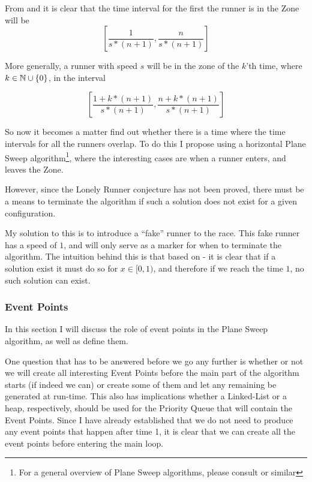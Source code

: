 From  and  it is clear that the time interval for the first the runner is in the Zone will be 
\begin{displaymath}
\left[\frac{1}{s * (n+1)}, \frac{n}{s * (n+1)}\right]
\end{displaymath}

More generally, a runner with speed $s$ will be in the zone of the $k$'th time, where $k \in \mathbb{N} \cup \{0\}$, in the interval 

\begin{displaymath}
\left[\frac{1 + k * (n+1)}{s * (n+1)}, \frac{n + k * (n+1)}{s * (n+1)}\right] 
\end{displaymath}

So now it becomes a matter find out whether there is a time where the time intervals for all the runners overlap. To do this I propose using a horizontal Plane Sweep algorithm\footnote{For a general overview of Plane Sweep algorithms, please consult \cite{citeulike:3347056} or similar}, where the interesting cases are when a runner enters, and leaves the Zone. 

However, since the Lonely Runner conjecture has not been proved, there must be a means to terminate the algorithm if such a solution does not exist for a given configuration.

My solution to this is to introduce a ``fake'' runner to the race. This fake runner has a speed of $1$, and will only serve as a marker for when to terminate the algorithm. The intuition behind this is that based on  - it is clear that if a solution exist it must do so for $x \in [0,1)$, and therefore if we reach the time $1$, no such solution can exist. 

\subsubsection{Event Points}
\label{eventPoints}
In this section I will discuss the role of event points in the Plane Sweep algorithm, as well as define them.

One question that has to be answered before we go any further is whether or not we will create all interesting Event Points before the main part of the algorithm starts (if indeed we can) or create some of them and let any remaining be generated at run-time. This also has implications whether a Linked-List or a heap, respectively, should be used for the Priority Queue that will contain the Event Points. Since I have already established that we do not need to produce any event points that happen after time 1, it is clear that we can create all the event points before entering the main loop. 

